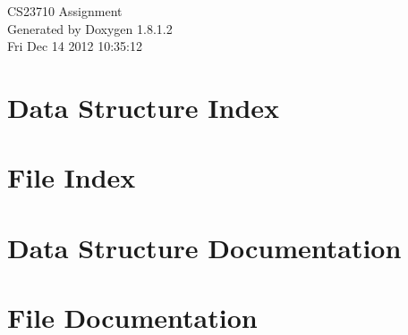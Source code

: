 \documentclass{book}
\begin{document}
\hypersetup{pageanchor=false,citecolor=blue}
\begin{titlepage}
\vspace*{7cm}
\begin{center}
{\Large C\-S23710 Assignment }\\
\vspace*{1cm}
{\large Generated by Doxygen 1.8.1.2}\\
\vspace*{0.5cm}
{\small Fri Dec 14 2012 10:35:12}\\
\end{center}
\end{titlepage}
\clearemptydoublepage
{}
\tableofcontents
\clearemptydoublepage
{}
\hypersetup{pageanchor=true,citecolor=blue}
\chapter{Data Structure Index}

\chapter{File Index}

\chapter{Data Structure Documentation}












\chapter{File Documentation}



















\printindex
\end{document}

